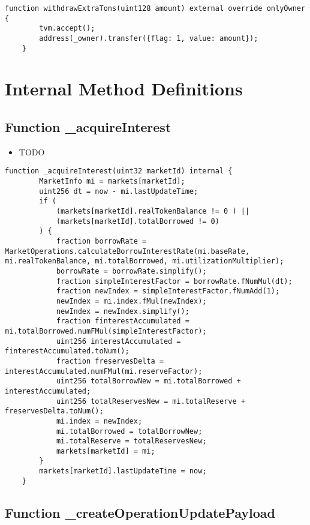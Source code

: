 \begin{lstlisting}[firstnumber=231]
    function withdrawExtraTons(uint128 amount) external override onlyOwner {
        tvm.accept();
        address(_owner).transfer({flag: 1, value: amount});
    }
\end{lstlisting}

\section{Internal Method Definitions}


\subsection{Function \_{}acquireInterest}

\noindent\begin{itemize}
\item TODO
\end{itemize}

\begin{lstlisting}[firstnumber=126]
    function _acquireInterest(uint32 marketId) internal {
        MarketInfo mi = markets[marketId];
        uint256 dt = now - mi.lastUpdateTime;
        if (
            (markets[marketId].realTokenBalance != 0 ) ||
            (markets[marketId].totalBorrowed != 0)
        ) {
            fraction borrowRate = MarketOperations.calculateBorrowInterestRate(mi.baseRate, mi.realTokenBalance, mi.totalBorrowed, mi.utilizationMultiplier);
            borrowRate = borrowRate.simplify();
            fraction simpleInterestFactor = borrowRate.fNumMul(dt);
            fraction newIndex = simpleInterestFactor.fNumAdd(1);
            newIndex = mi.index.fMul(newIndex);
            newIndex = newIndex.simplify();
            fraction finterestAccumulated = mi.totalBorrowed.numFMul(simpleInterestFactor);
            uint256 interestAccumulated = finterestAccumulated.toNum();
            fraction freservesDelta = interestAccumulated.numFMul(mi.reserveFactor);
            uint256 totalBorrowNew = mi.totalBorrowed + interestAccumulated;
            uint256 totalReservesNew = mi.totalReserve + freservesDelta.toNum();
            mi.index = newIndex;
            mi.totalBorrowed = totalBorrowNew;
            mi.totalReserve = totalReservesNew;
            markets[marketId] = mi;
        }
        markets[marketId].lastUpdateTime = now;
    }
\end{lstlisting}

\subsection{Function \_{}createOperationUpdatePayload}

